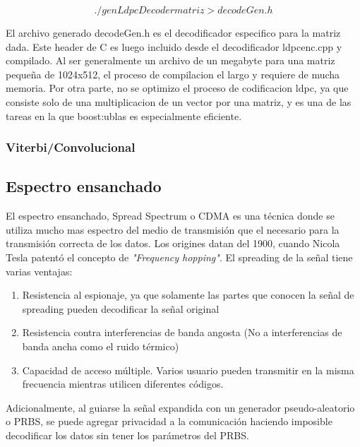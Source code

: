 $$ ./genLdpcDecoder matriz  > decodeGen.h $$

El archivo generado decodeGen.h es el decodificador especifico para la matriz dada. Este header de C es luego incluido desde el decodificador ldpcenc.cpp y compilado. Al ser generalmente un archivo de un megabyte para una matriz pequeña de 1024x512, el proceso de compilacion el largo y requiere de mucha memoria.
Por otra parte, no se optimizo el proceso de codificacion ldpc, ya que consiste solo de una multiplicacion de un vector por una matriz, y es una de las tareas en la que boost:ublas es especialmente eficiente.


\subsubsection{Viterbi/Convolucional}

\subsection{Espectro ensanchado}
\label{espectroensanchado}
El espectro ensanchado, Spread Spectrum o CDMA es una técnica donde se utiliza mucho mas espectro del medio de transmisión que el necesario para la transmisión correcta de los datos.
Los origines datan del 1900, cuando Nicola Tesla patentó el concepto de \textit{"Frequency hopping"}.
El spreading de la señal tiene varias ventajas:
\begin{enumerate} 
\item Resistencia al espionaje, ya que solamente las partes que conocen la señal de spreading pueden decodificar la señal original
\item Resistencia contra interferencias de banda angosta (No a interferencias de banda ancha como el ruido térmico)
\item Capacidad de acceso múltiple. Varios usuario pueden transmitir en la misma frecuencia mientras utilicen diferentes códigos.
\end{enumerate} 
Adicionalmente, al guiarse la señal expandida con un generador pseudo-aleatorio o PRBS, se puede agregar privacidad a la comunicación haciendo imposible decodificar los datos sin tener los parámetros del PRBS.


